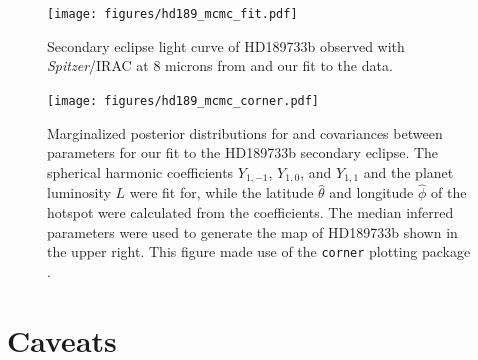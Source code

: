 \documentclass[modern]{aastex61}
\begin{document}
%
\begin{figure}[t!]
    \begin{centering}
    \texttt{[image: figures/hd189\_mcmc\_fit.pdf]}
    \caption{\label{fig:hd189_mcmc_fit} Secondary eclipse light curve of HD189733b observed with \textit{Spitzer}/IRAC at 8 microns from \citet{Knutson2007} and our fit to the data. }
    \end{centering}
\end{figure}
%
\begin{figure}[t!]
    \begin{centering}
    \texttt{[image: figures/hd189\_mcmc\_corner.pdf]}
    \caption{\label{fig:hd189_mcmc_corner} Marginalized posterior distributions for and covariances between parameters for our fit to the HD189733b secondary eclipse. The spherical harmonic coefficients $Y_{1,-1}$, $Y_{1,0}$, and $Y_{1,1}$ and the planet luminosity $L$ were fit for, while the latitude $\hat{\theta}$ and longitude $\hat{\phi}$ of the hotspot were calculated from the coefficients. The median inferred parameters were used to generate the map of HD189733b shown in the upper right. This figure made use of the \texttt{corner} plotting package \citep{Foreman-Mackey2016}. }
    \end{centering}
\end{figure}
%

\section{Caveats}
\label{sec:caveats}
\end{document}
